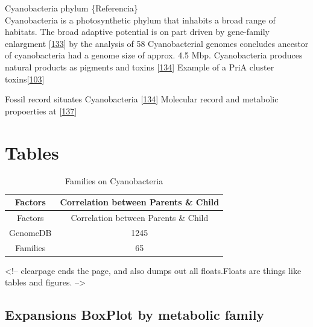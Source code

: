 \documentclass[12pt,twoside]{reedthesis}
\begin{document}
  Cyanobacteria phylum \{Referencia\}\\
  Cyanobacteria is a photosynthetic phylum that inhabits a broad range of
  habitats. The broad adaptive potential is on part driven by gene-family
  enlargment {[}\protect\hyperlink{ref-larsson_genome_2011}{133}{]} by the
  analysis of 58 Cyanobacterial genomes concludes ancestor of
  cyanobacteria had a genome size of approx. 4.5 Mbp. Cyanobacteria
  produces natural products as pigments and toxins
  {[}\protect\hyperlink{ref-whitton_ecology_2012}{134}{]} Example of a
  PriA cluster
  toxins{[}\protect\hyperlink{ref-moustafa_origin_2009}{103}{]}
  
  Fossil record situates Cyanobacteria
  {[}\protect\hyperlink{ref-whitton_ecology_2012}{134}{]} Molecular record
  and metabolic propoerties at
  {[}\protect\hyperlink{ref-battistuzzi_genomic_2004}{137}{]}
  
  \section{Tables}\label{tables-2}
  
  \begin{longtable}[]{@{}cc@{}}
  \caption{Families on Cyanobacteria \label{tab:inher}}\tabularnewline
  \toprule
  Factors & Correlation between Parents \& Child\tabularnewline
  \midrule
  \endfirsthead
  \toprule
  Factors & Correlation between Parents \& Child\tabularnewline
  \midrule
  \endhead
  GenomeDB & 1245\tabularnewline
  Families & 65\tabularnewline
  \bottomrule
  \end{longtable}
  
  \clearpage
  <!-- clearpage ends the page, and also dumps out all floats.Floats are things like tables and figures. 
  -->
  
  \subsection{Expansions BoxPlot by metabolic
  family}\label{expansions-boxplot-by-metabolic-family-2}
  
  \begin{Shaded}
  \begin{Highlighting}[]
  \NormalTok{(} \NormalTok{, } \NormalTok{,} \NormalTok{, } \NormalTok{)}
  \end{Highlighting}
  \end{Shaded}
  
\end{document}
